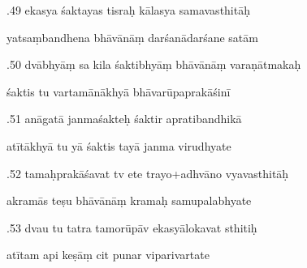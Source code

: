 \documentclass[article,12pt,a4paper]{memoir}%
\newcounter{parCount}
\begin{document}
	  
	  \pstart {}.49 ekasya śaktayas tisraḥ kālasya samavasthitāḥ 
	{}
	\pend%
      

	  
	  \pstart \leavevmode%
	yatsaṃbandhena bhāvānāṃ darśanādarśane satām 
	{}
	\pend%
      

	  
	  \pstart {}.50 dvābhyāṃ sa kila śaktibhyāṃ bhāvānāṃ varaṇātmakaḥ 
	{}
	\pend%
      

	  
	  \pstart \leavevmode%
	śaktis tu vartamānākhyā bhāvarūpaprakāśinī 
	{}
	\pend%
      

	  
	  \pstart {}.51 anāgatā janmaśakteḥ śaktir apratibandhikā 
	{}
	\pend%
      

	  
	  \pstart \leavevmode%
	atītākhyā tu yā śaktis tayā janma virudhyate 
	{}
	\pend%
      

	  
	  \pstart {}.52 tamaḥprakāśavat tv ete trayo+adhvāno vyavasthitāḥ 
	{}
	\pend%
      

	  
	  \pstart \leavevmode%
	akramās teṣu bhāvānāṃ kramaḥ samupalabhyate 
	{}
	\pend%
      

	  
	  \pstart {}.53 dvau tu tatra tamorūpāv ekasyālokavat sthitiḥ 
	{}
	\pend%
      

	  
	  \pstart \leavevmode%
	atītam api keṣāṃ cit punar viparivartate 
	{}
	\pend%
      
\end{document}
